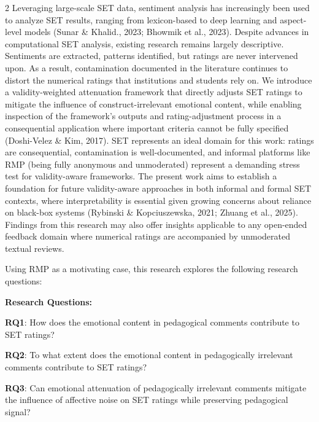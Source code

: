 \documentclass{article}
\begin{document}
\begin{multicols*}{2}
Leveraging large-scale SET data, sentiment analysis has increasingly been used to analyze SET results, ranging from lexicon-based to deep learning and aspect-level models (Sunar \& Khalid., 2023; Bhowmik et al., 2023). Despite advances in computational SET analysis, existing research remains largely descriptive. Sentiments are extracted, patterns identified, but ratings are never intervened upon. As a result, contamination documented in the literature continues to distort the numerical ratings that institutions and students rely on. We introduce a validity-weighted attenuation framework that directly adjusts SET ratings to mitigate the influence of construct-irrelevant emotional content, while enabling inspection of the framework’s outputs and rating-adjustment process in a consequential application where important criteria cannot be fully specified (Doshi-Velez \& Kim, 2017). SET represents an ideal domain for this work: ratings are consequential, contamination is well-documented, and informal platforms like RMP (being fully anonymous and unmoderated) represent a demanding stress test for validity-aware frameworks. The present work aims to establish a foundation for future validity-aware approaches in both informal and formal SET contexts, where interpretability is essential given growing concerns about reliance on black-box systems (Rybinski \& Kopciuszewska, 2021; Zhuang et al., 2025). Findings from this research may also offer insights applicable to any open-ended feedback domain where numerical ratings are accompanied by unmoderated textual reviews.

Using RMP as a motivating case, this research explores the following research questions:\newline

\textbf{Research Questions:}

\textbf{RQ1}: How does the emotional content in pedagogical comments contribute to SET ratings?

\textbf{RQ2}: To what extent does the emotional content in pedagogically irrelevant comments contribute to SET ratings? 

\textbf{RQ3}: Can emotional attenuation of pedagogically irrelevant comments mitigate the influence of affective noise on SET ratings while preserving pedagogical signal?
\newline


\end{multicols*}
\end{document}
